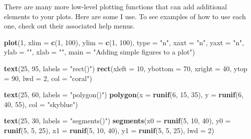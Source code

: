 \documentclass[]{book}
\newenvironment{Shaded}{\begin{snugshade}}{\end{snugshade}}
\newcommand{\KeywordTok}[1]{\textcolor[rgb]{0.13,0.29,0.53}{\textbf{{#1}}}}
\newcommand{\DataTypeTok}[1]{\textcolor[rgb]{0.13,0.29,0.53}{{#1}}}
\newcommand{\DecValTok}[1]{\textcolor[rgb]{0.00,0.00,0.81}{{#1}}}
\newcommand{\StringTok}[1]{\textcolor[rgb]{0.31,0.60,0.02}{{#1}}}
\newcommand{\NormalTok}[1]{{#1}}
\theoremstyle{definition}
\theoremstyle{definition}
\theoremstyle{remark}
\begin{document}
There are many more low-level plotting functions that can add additional
elements to your plots. Here are some I use. To see examples of how to
use each one, check out their associated help menus.

\begin{Shaded}
\begin{Highlighting}[]
\KeywordTok{plot}\NormalTok{(}\DecValTok{1}\NormalTok{, }\DataTypeTok{xlim =} \KeywordTok{c}\NormalTok{(}\DecValTok{1}\NormalTok{, }\DecValTok{100}\NormalTok{), }\DataTypeTok{ylim =} \KeywordTok{c}\NormalTok{(}\DecValTok{1}\NormalTok{, }\DecValTok{100}\NormalTok{),}
     \DataTypeTok{type =} \StringTok{"n"}\NormalTok{, }\DataTypeTok{xaxt =} \StringTok{"n"}\NormalTok{, }\DataTypeTok{yaxt =} \StringTok{"n"}\NormalTok{,}
     \DataTypeTok{ylab =} \StringTok{""}\NormalTok{, }\DataTypeTok{xlab =} \StringTok{""}\NormalTok{, }\DataTypeTok{main =} \StringTok{"Adding simple figures to a plot"}\NormalTok{)}

\KeywordTok{text}\NormalTok{(}\DecValTok{25}\NormalTok{, }\DecValTok{95}\NormalTok{, }\DataTypeTok{labels =} \StringTok{"rect()"}\NormalTok{)}
\KeywordTok{rect}\NormalTok{(}\DataTypeTok{xleft =} \DecValTok{10}\NormalTok{, }\DataTypeTok{ybottom =} \DecValTok{70}\NormalTok{,}
     \DataTypeTok{xright =} \DecValTok{40}\NormalTok{, }\DataTypeTok{ytop =} \DecValTok{90}\NormalTok{, }\DataTypeTok{lwd =} \DecValTok{2}\NormalTok{, }\DataTypeTok{col =} \StringTok{"coral"}\NormalTok{)}

\KeywordTok{text}\NormalTok{(}\DecValTok{25}\NormalTok{, }\DecValTok{60}\NormalTok{, }\DataTypeTok{labels =} \StringTok{"polygon()"}\NormalTok{)}
\KeywordTok{polygon}\NormalTok{(}\DataTypeTok{x =} \KeywordTok{runif}\NormalTok{(}\DecValTok{6}\NormalTok{, }\DecValTok{15}\NormalTok{, }\DecValTok{35}\NormalTok{),}
        \DataTypeTok{y =} \KeywordTok{runif}\NormalTok{(}\DecValTok{6}\NormalTok{, }\DecValTok{40}\NormalTok{, }\DecValTok{55}\NormalTok{),}
        \DataTypeTok{col =} \StringTok{"skyblue"}\NormalTok{)}

\KeywordTok{text}\NormalTok{(}\DecValTok{25}\NormalTok{, }\DecValTok{30}\NormalTok{, }\DataTypeTok{labels =} \StringTok{"segments()"}\NormalTok{)}
\KeywordTok{segments}\NormalTok{(}\DataTypeTok{x0 =} \KeywordTok{runif}\NormalTok{(}\DecValTok{5}\NormalTok{, }\DecValTok{10}\NormalTok{, }\DecValTok{40}\NormalTok{),}
         \DataTypeTok{y0 =} \KeywordTok{runif}\NormalTok{(}\DecValTok{5}\NormalTok{, }\DecValTok{5}\NormalTok{, }\DecValTok{25}\NormalTok{),}
         \DataTypeTok{x1 =} \KeywordTok{runif}\NormalTok{(}\DecValTok{5}\NormalTok{, }\DecValTok{10}\NormalTok{, }\DecValTok{40}\NormalTok{),}
         \DataTypeTok{y1 =} \KeywordTok{runif}\NormalTok{(}\DecValTok{5}\NormalTok{, }\DecValTok{5}\NormalTok{, }\DecValTok{25}\NormalTok{), }
         \DataTypeTok{lwd =} \DecValTok{2}\NormalTok{)}


\end{Highlighting}
\end{Shaded}
\end{document}
